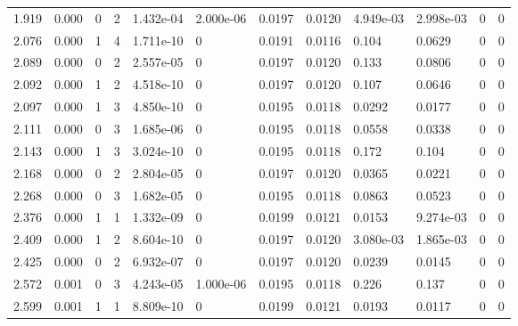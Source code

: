 \documentclass[preview]{standalone}
\begin{document}
{{\begin{tabular}{L{1.2cm}C{1.2cm} C{0.3cm}C{0.5cm} C{1.4cm}C{1.4cm} C{1.4cm}C{1.4cm} C{1.6cm}C{1.6cm} C{1.6cm}C{1.6cm}}
  1.919  &  0.000  & 0     &  2 &  1.432e-04  & 2.000e-06  &  0.0197&   0.0120& 4.949e-03 & 2.998e-03   &  0 & 0  \\ 
  2.076  &  0.000  & 1     &  4 &  1.711e-10  & 0  &  0.0191&   0.0116& 0.104 & 0.0629   &  0 & 0  \\ 
  2.089  &  0.000  & 0     &  2 &  2.557e-05  & 0  &  0.0197&   0.0120& 0.133 & 0.0806   &  0 & 0  \\ 
  2.092  &  0.000  & 1     &  2 &  4.518e-10  & 0  &  0.0197&   0.0120& 0.107 & 0.0646   &  0 & 0  \\ 
  2.097  &  0.000  & 1     &  3 &  4.850e-10  & 0  &  0.0195&   0.0118& 0.0292 & 0.0177   &  0 & 0  \\ 
  2.111  &  0.000  & 0     &  3 &  1.685e-06  & 0  &  0.0195&   0.0118& 0.0558 & 0.0338   &  0 & 0  \\ 
  2.143  &  0.000  & 1     &  3 &  3.024e-10  & 0  &  0.0195&   0.0118& 0.172 & 0.104   &  0 & 0  \\ 
  2.168  &  0.000  & 0     &  2 &  2.804e-05  & 0  &  0.0197&   0.0120& 0.0365 & 0.0221   &  0 & 0  \\ 
  2.268  &  0.000  & 0     &  3 &  1.682e-05  & 0  &  0.0195&   0.0118& 0.0863 & 0.0523   &  0 & 0  \\ 
  2.376  &  0.000  & 1     &  1 &  1.332e-09  & 0  &  0.0199&   0.0121& 0.0153 & 9.274e-03   &  0 & 0  \\ 
  2.409  &  0.000  & 1     &  2 &  8.604e-10  & 0  &  0.0197&   0.0120& 3.080e-03 & 1.865e-03   &  0 & 0  \\ 
  2.425  &  0.000  & 0     &  2 &  6.932e-07  & 0  &  0.0197&   0.0120& 0.0239 & 0.0145   &  0 & 0  \\ 
  2.572  &  0.001  & 0     &  3 &  4.243e-05  & 1.000e-06  &  0.0195&   0.0118& 0.226 & 0.137   &  0 & 0  \\ 
  2.599  &  0.001  & 1     &  1 &  8.809e-10  & 0  &  0.0199&   0.0121& 0.0193 & 0.0117   &  0 & 0  \\ 
\hline 
\end{tabular} 

}}
\end{document}
